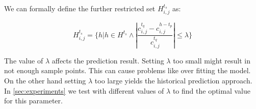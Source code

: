 We can formally define the further restricted set $H_{i,j}^{t_s}$ as:

\begin{equation}
H_{i,j}^{t_s} = \{h|h \in H^{t_s} \wedge \left| \frac{c_{i,j}^{t_q} - c_{i,j}^{h-t_p}}{c_{i,j}^{t_q}} \right| \leq \lambda \}  
\end{equation}

The value of $\lambda$ affects the prediction result. Setting $\lambda$ too small might result in not enough sample points. This can cause problems like over fitting the model. On the other hand setting $\lambda$ too large yields the historical prediction approach. In \cref{sec:experiments} we test with different values of $\lambda$ to find the optimal value for this parameter. 


